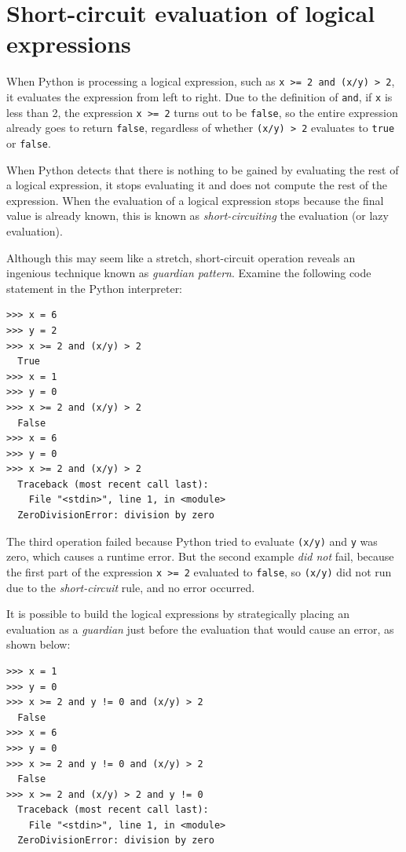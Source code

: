 \hypertarget{evaluaciuxf3n-en-cortocircuito-de-expresiones-luxf3gicas}{%
\section{Short-circuit evaluation of logical expressions}\label{evaluaciuxf3n-en-cortocircuito-de-expresiones-luxf3gicas}}


When Python is processing a logical expression, such as \texttt{x\ >=\ 2\ and\ (x/y)\ >\ 2}, it evaluates the expression from left to right. Due to the definition of \texttt{and}, if \texttt{x} is less than 2, the expression \texttt{x\ >=\ 2} turns out to be \texttt{false}, so the entire expression already goes to return \texttt{false}, regardless of whether \texttt{(x/y)\ >\ 2} evaluates to \texttt{true} or \texttt{false}.

When Python detects that there is nothing to be gained by evaluating the rest of a logical expression, it stops evaluating it and does not compute the rest of the expression. When the evaluation of a logical expression stops because the final value is already known, this is known as \emph{short-circuiting} the evaluation (or lazy evaluation).

Although this may seem like a stretch, short-circuit operation reveals an ingenious technique known as \emph{guardian pattern}. Examine the following code statement in the Python interpreter:

\begin{Verbatim}[frame=single]
>>> x = 6
>>> y = 2
>>> x >= 2 and (x/y) > 2
  True
>>> x = 1
>>> y = 0
>>> x >= 2 and (x/y) > 2
  False
>>> x = 6
>>> y = 0
>>> x >= 2 and (x/y) > 2
  Traceback (most recent call last):
    File "<stdin>", line 1, in <module>
  ZeroDivisionError: division by zero
\end{Verbatim}

The third operation failed because Python tried to evaluate
\texttt{(x/y)} and \texttt{y} was zero, which causes a runtime error. But the second example \emph{did not} fail, because the first part of the expression \texttt{x\ >=\ 2} evaluated to \texttt{false}, so \texttt{(x/y)} did not run due to the \emph{short-circuit} rule, and no error occurred.

It is possible to build the logical expressions by strategically placing an evaluation as a \emph{guardian} just before the evaluation that would cause an error, as shown below:

\begin{Verbatim}[frame=single]
>>> x = 1
>>> y = 0
>>> x >= 2 and y != 0 and (x/y) > 2
  False
>>> x = 6
>>> y = 0
>>> x >= 2 and y != 0 and (x/y) > 2
  False
>>> x >= 2 and (x/y) > 2 and y != 0
  Traceback (most recent call last):
    File "<stdin>", line 1, in <module>
  ZeroDivisionError: division by zero
\end{Verbatim}

